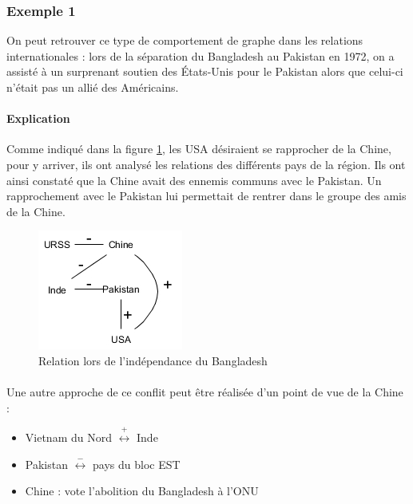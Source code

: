 \subsubsection*{Exemple 1}

On peut retrouver ce type de comportement de graphe dans les relations internationales : lors de la séparation du Bangladesh au Pakistan en 1972, on a assisté à un surprenant soutien des États-Unis pour le Pakistan alors que celui-ci n'était pas un allié des Américains. 
\paragraph{Explication} 
Comme indiqué dans la figure \ref{paysconflit}, les USA désiraient se rapprocher de la Chine, pour y arriver, ils ont analysé les relations des différents pays de la région. Ils ont ainsi constaté que la Chine avait des ennemis communs avec le Pakistan. Un rapprochement avec le Pakistan lui permettait de rentrer dans le groupe des amis de la Chine.


\begin{figure}[h!]
\label{groupami}
\label{paysconflit}
\caption{Relation lors de l'indépendance du Bangladesh}
\centering
\includegraphics[scale=1]{images/22_pays-conflit.png}
\end{figure}
\paragraph{}
Une autre approche de ce conflit peut être réalisée d'un point de vue de la Chine : 
\begin{itemize}

\item Vietnam du Nord $\overset{+}{\longleftrightarrow}$ Inde

\item Pakistan $\overset{-}{\longleftrightarrow}$ pays du bloc EST

\item Chine : vote l'abolition du Bangladesh à l'ONU

\end{itemize}

